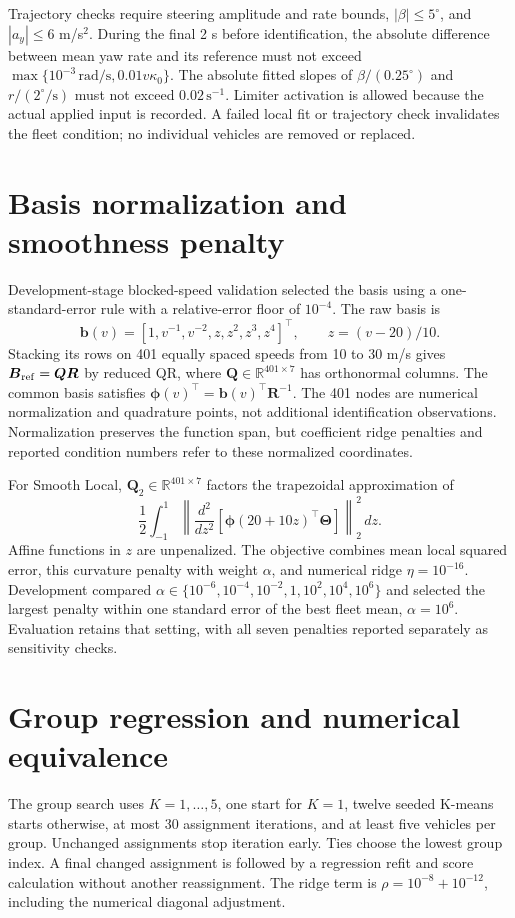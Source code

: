\documentclass[10pt]{article}
\begin{document}
Trajectory checks require steering amplitude and rate bounds,
$|\beta|\leq5^\circ$, and $|a_y|\leq6$ m/s$^2$. During the final 2 s before
identification, the absolute difference between mean yaw rate and its reference must not exceed
$\max\{10^{-3}\,\mathrm{rad/s},0.01v\kappa_0\}$.
The absolute fitted slopes of $\beta/(0.25^\circ)$ and
$r/(2^\circ/\mathrm{s})$ must not exceed $0.02\,\mathrm{s}^{-1}$.
Limiter activation is allowed because the actual applied input is recorded.
A failed local fit or trajectory check invalidates the fleet condition;
no individual vehicles are removed or replaced.

\section{Basis normalization and smoothness penalty}
\textcolor{revisionred}{Development-stage blocked-speed validation selected the
basis using a one-standard-error rule with a relative-error floor of $10^{-4}$.}
The raw basis is
\[
\boldsymbol b(v)=[1,v^{-1},v^{-2},z,z^2,z^3,z^4]^\top,
\qquad z=(v-20)/10.
\]
Stacking its rows on 401 equally spaced speeds from 10 to 30 m/s gives
$\boldsymbol B_{\rm ref}=\boldsymbol Q\boldsymbol R$ by reduced QR,
where $\boldsymbol Q\in\mathbb R^{401\times7}$ has orthonormal columns.
The common basis satisfies
$\boldsymbol\phi(v)^\top=\boldsymbol b(v)^\top\boldsymbol R^{-1}$.
The 401 nodes are numerical normalization and quadrature points, not
additional identification observations. Normalization preserves the function
span, but coefficient ridge penalties and reported condition numbers refer
to these normalized coordinates.

For Smooth Local, $\boldsymbol Q_2\in\mathbb R^{401\times7}$ factors the
trapezoidal approximation of
\[
\frac12\int_{-1}^{1}
\left\|\frac{d^2}{dz^2}
  [\boldsymbol\phi(20+10z)^\top\boldsymbol\Theta]\right\|_2^2\,dz.
\]
Affine functions in $z$ are unpenalized. The objective combines mean local
squared error, this curvature penalty with weight $\alpha$, and numerical
ridge $\eta=10^{-16}$. Development compared
$\alpha\in\{10^{-6},10^{-4},10^{-2},1,10^2,10^4,10^6\}$ and selected the
largest penalty within one standard error of the best fleet mean,
$\alpha=10^6$. Evaluation retains that setting, with all seven penalties
reported separately as sensitivity checks.

\section{Group regression and numerical equivalence}
The group search uses $K=1,\ldots,5$, one start for $K=1$, twelve seeded
K-means starts otherwise, at most 30 assignment iterations, and at least
five vehicles per group. Unchanged assignments stop iteration early.
Ties choose the lowest group index. A final changed assignment is followed
by a regression refit and score calculation without another reassignment.
The ridge term is $\rho=10^{-8}+10^{-12}$, including the numerical diagonal
adjustment.
\end{document}
